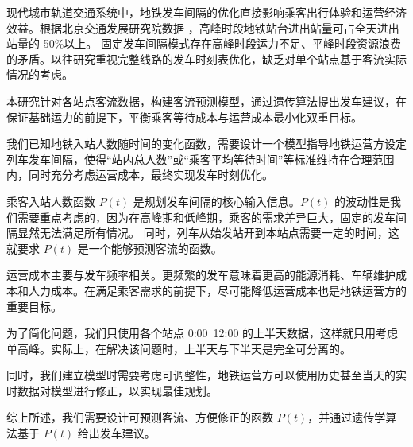 \setcounter{page}{1}



现代城市轨道交通系统中，地铁发车间隔的优化直接影响乘客出行体验和运营经济效益。根据北京交通发展研究院数据 \cite{BeijingTransportDevReport2024}，高峰时段地铁站台进出站量可占全天进出站量的 50\%以上。
固定发车间隔模式存在高峰时段运力不足、平峰时段资源浪费的矛盾。以往研究重视完整线路的发车时刻表优化，缺乏对单个站点基于客流实际情况的考虑。

本研究针对各站点客流数据，构建客流预测模型，通过遗传算法提出发车建议，在保证基础运力的前提下，平衡乘客等待成本与运营成本最小化双重目标。


我们已知地铁入站人数随时间的变化函数，需要设计一个模型指导地铁运营方设定列车发车间隔，使得“站内总人数”或“乘客平均等待时间”等标准维持在合理范围内，同时充分考虑运营成本，最终实现发车时刻优化。



乘客入站人数函数 $P(t)$ 是规划发车间隔的核心输入信息。$P(t)$ 的波动性是我们需要重点考虑的，因为在高峰期和低峰期，乘客的需求差异巨大，固定的发车间隔显然无法满足所有情况。
同时，列车从始发站开到本站点需要一定的时间，这就要求 $P(t)$ 是一个能够预测客流的函数。

运营成本主要与发车频率相关。更频繁的发车意味着更高的能源消耗、车辆维护成本和人力成本。在满足乘客需求的前提下，尽可能降低运营成本也是地铁运营方的重要目标。

为了简化问题，我们只使用各个站点 0:00~12:00 的上半天数据，这样就只用考虑单高峰。实际上，在解决该问题时，上半天与下半天是完全可分离的。

同时，我们建立模型时需要考虑可调整性，地铁运营方可以使用历史甚至当天的实时数据对模型进行修正，以实现最佳规划。

综上所述，我们需要设计可预测客流、方便修正的函数 $P(t)$，并通过遗传学算法基于 $P(t)$ 给出发车建议。



